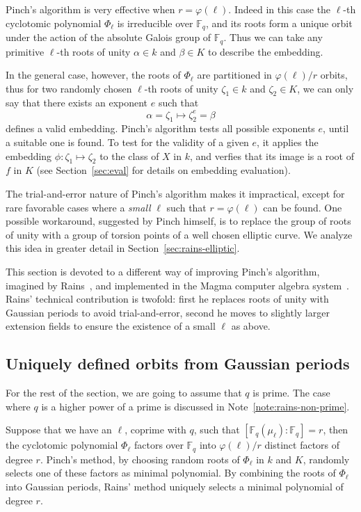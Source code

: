 \documentclass[12pt]{article}
\theoremstyle{plain}
\theoremstyle{definition}
\def\F{\ensuremath{\mathbb{F}}}
\def\euler{\ensuremath{\varphi}}
\newcounter{algorithm}
\begin{document}
Pinch's algorithm is very effective when $r=\euler(\ell)$. Indeed in
this case the $\ell$-th cyclotomic polynomial $\Phi_\ell$ is
irreducible over $\F_q$, and its roots form a unique orbit under the
action of the absolute Galois group of $\F_q$. Thus we can take any
primitive $\ell$-th roots of unity $\alpha\in k$ and $\beta\in K$ to
describe the embedding.

In the general case, however, the roots of $\Phi_\ell$ are partitioned
in $\euler(\ell)/r$ orbits, thus for two randomly chosen $\ell$-th
roots of unity $\zeta_1\in k$ and $\zeta_2\in K$, we can only say that
there exists an exponent $e$ such that
\begin{equation*}
  \alpha = \zeta_1 \mapsto \zeta_2^e = \beta
\end{equation*}
defines a valid embedding. Pinch's algorithm tests all possible
exponents $e$, until a suitable one is found. To test for the validity
of a given $e$, it applies the embedding $\phi:\zeta_1\mapsto\zeta_2$
to the class of $X$ in $k$, and verfies that its image is a root of
$f$ in $K$ (see Section~\ref{sec:eval} for details on embedding
evaluation).

The trial-and-error nature of Pinch's algorithm makes it impractical,
except for rare favorable cases where a \emph{small} $\ell$ such that
$r=\euler(\ell)$ can be found. One possible workaround, suggested by
Pinch himself, is to replace the group of roots of unity with a group
of torsion points of a well chosen elliptic curve. We analyze this
idea in greater detail in Section~\ref{sec:rains-elliptic}.

This section is devoted to a different way of improving Pinch's
algorithm, imagined by Rains~\cite{rains2008}, and implemented in the
Magma computer algebra system~\cite{MAGMA}. Rains' technical
contribution is twofold: first he replaces roots of unity with
Gaussian periods to avoid trial-and-error, second he moves to slightly
larger extension fields to ensure the existence of a small $\ell$ as
above.

\subsection{Uniquely defined orbits from Gaussian periods}

For the rest of the section, we are going to assume that $q$ is
prime. The case where $q$ is a higher power of a prime is discussed in
Note~\ref{note:rains-non-prime}.

Suppose that we have an $\ell$, coprime with $q$, such that
$[\F_q(\mu_\ell):\F_q]=r$, then the cyclotomic polynomial $\Phi_\ell$
factors over $\F_q$ into $\euler(\ell)/r$ distinct factors of degree
$r$. Pinch's method, by choosing random roots of $\Phi_\ell$ in $k$
and $K$, randomly selects one of these factors as minimal polynomial.
By combining the roots of $\Phi_\ell$ into Gaussian periods, Rains'
method uniquely selects a minimal polynomial of degree $r$.
\end{document}
